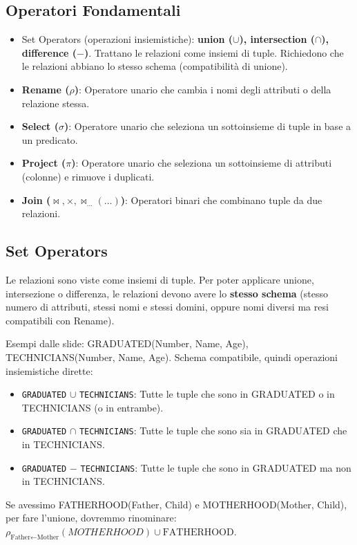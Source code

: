 \documentclass{article}
\newcommand{\union}{\cup}
\newcommand{\intersection}{\cap}
\newcommand{\rename}[2]{\rho_{#1}(#2)}
\newcommand{\naturaljoin}{\Join}
\newcommand{\thetajoin}[2]{\Join_{#1}(#2)}
\begin{document}
	\subsection{Operatori Fondamentali}
	\begin{itemize}
		\item Set Operators (operazioni insiemistiche): \textbf{union ($\union$), intersection ($\intersection$), difference ($-$)}. Trattano le relazioni come insiemi di tuple. Richiedono che le relazioni abbiano lo stesso schema (compatibilità di unione).
		\item \textbf{Rename ($\rho$)}: Operatore unario che cambia i nomi degli attributi o della relazione stessa.
		\item \textbf{Select ($\sigma$)}: Operatore unario che seleziona un sottoinsieme di tuple in base a un predicato.
		\item \textbf{Project ($\pi$)}: Operatore unario che seleziona un sottoinsieme di attributi (colonne) e rimuove i duplicati.
		\item \textbf{Join ($\naturaljoin, \times, \thetajoin{...}{...}$)}: Operatori binari che combinano tuple da due relazioni.
	\end{itemize}
	
	\subsection{Set Operators}
	Le relazioni sono viste come insiemi di tuple. Per poter applicare unione, intersezione o differenza, le relazioni devono avere lo \textbf{stesso schema} (stesso numero di attributi, stessi nomi e stessi domini, oppure nomi diversi ma resi compatibili con Rename).
	
	Esempi dalle slide: GRADUATED(Number, Name, Age), TECHNICIANS(Number, Name, Age).
	Schema compatibile, quindi operazioni insiemistiche dirette:
	\begin{itemize}
		\item \texttt{GRADUATED} $\union$ \texttt{TECHNICIANS}: Tutte le tuple che sono in GRADUATED o in TECHNICIANS (o in entrambe).
		\item \texttt{GRADUATED} $\intersection$ \texttt{TECHNICIANS}: Tutte le tuple che sono sia in GRADUATED che in TECHNICIANS.
		\item \texttt{GRADUATED} $-$ \texttt{TECHNICIANS}: Tutte le tuple che sono in GRADUATED ma non in TECHNICIANS.
	\end{itemize}
	Se avessimo FATHERHOOD(Father, Child) e MOTHERHOOD(Mother, Child), per fare l'unione, dovremmo rinominare: $\rename{\text{Father} \leftarrow \text{Mother}}{MOTHERHOOD} \union \text{FATHERHOOD}$.
	
\end{document}
